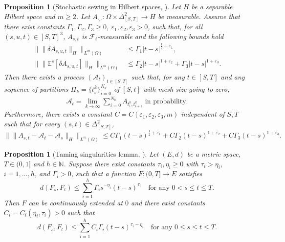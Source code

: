 \documentclass[11pt,a4paper]{article}
\newcommand{\eps}{\varepsilon}
\newcommand{\EE}{\mathbb{E}}
\renewcommand{\ge}{\geqslant}
\renewcommand{\le}{\leqslant}
\numberwithin{equation}{section}
\theoremstyle{definition}
\theoremstyle{remark}
\theoremstyle{plain}
\newtheorem{proposition}[definition]{Proposition}
\begin{document}
\begin{proposition}[Stochastic sewing in Hilbert spaces, {\cite[Theorem 3.1]{Le}}] \label{lem:SSL}
Let $H$ be a separable Hilbert space and $m \geqslant 2$. Let $A_{\cdot,\cdot}\colon \Omega \times \Delta^2_{[S,T]}\rightarrow H$ be measurable. Assume that there exist constants $\Gamma_1,\Gamma_2, \Gamma_3\geqslant 0$, $\varepsilon_1,\varepsilon_2,\eps_3>0$, such that, for all $(s,u,t)\in[S,T]^3$, $A_{s,t}$ is $\mathcal{F}_t$-measurable and the following bounds hold
\begin{align}
\big\|\|\delta A_{s,u,t}\|_H\big\|_{L^m(\Omega)}&\leqslant \Gamma_1|t-s|^{\frac12+\varepsilon_1}, \label{eq:SSL2}
\\
    \big\|\|\EE^s[\delta A_{s,u,t}]\|_H\big\|_{L^m(\Omega)}&\leqslant  \Gamma_2|t-s|^{1+\varepsilon_2}+\Gamma_3|t-s|^{1+\varepsilon_3}\label{eq:SSL1}.    
\end{align}
Then there exists a process $(\mathcal{A}_t)_{t\in [S,T]}$ such that, for any $t \in [S,T]$ 
and any sequence of partitions $\Pi_k=\{t_i^k\}_{i=0}^{N_k}$ of $[S,t]$ with mesh size going 
to zero, 
\begin{align} \label{eq:SSLconv}
    \mathcal{A}_t=\lim_{k\rightarrow \infty}\sum_{i=0}^{N_k}A_{t_i^k,t_{i+1}^k} \text{ in probability.} 
\end{align}
Furthermore, there exists a constant $C=C(\varepsilon_1,\varepsilon_2,\eps_3,m)$ independent of $S,T$ such that for every $(s,t) \in \Delta^2_{[S,T]}$,
\begin{equation}\label{sslmres}
    \big\|\|A_{s,t}-\mathcal{A}_t-\mathcal{A}_s\|_H\big\|_{L^m(\Omega)}\leqslant C\Gamma_1 (t-s)^{\frac12+\varepsilon_1}+C \Gamma_2 (t-s)^{1+\varepsilon_2}+C \Gamma_3 (t-s)^{1+\varepsilon_3}.
\end{equation}
\end{proposition}


\begin{proposition}[Taming singularities lemma, \cite{BFG,le2021taming}]\label{e:mbb2}
Let $(E,d)$ be a metric space, $T\in(0,1]$ and $h \in \mathbb{N}$. Suppose there exist constants $\tau_i,\eta_i \ge 0$ with $\tau_i>\eta_i$, $i=1,\dots,h$, and $\Gamma_i>0$, such that a function $F\colon(0,T]\to E$ satisfies
\begin{equation*}
d(F_s,F_t) \le \sum_{i=1}^h\Gamma_i s^{-\eta_i}(t-s)^{\tau_i}\quad\text{for any $0< s\le t\le T$}.
\end{equation*}
Then $F$ can be continuously extended at $0$ and there exist constants $C_i=C_i(\eta_i,\tau_i)>0$ such that
\begin{equation}\label{rezult}
d(F_s,F_t)\le \sum_{i=1}^h C_i \Gamma_i(t-s)^{\tau_i- \eta_i}\quad\text{for any $0\le s\le t\le T$.}
\end{equation}	
\end{proposition}
\end{document}
